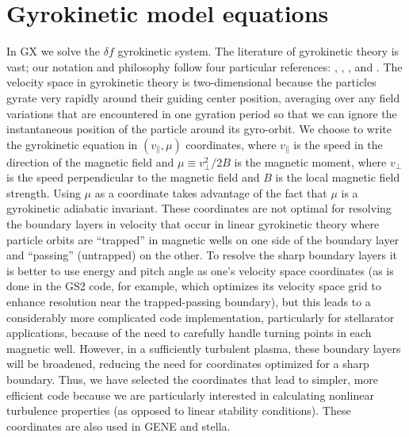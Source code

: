 \documentclass{jpp}
\newcommand{\GX}{{GX}\xspace}
\begin{document}
\section{Gyrokinetic model equations} \label{sec:gk}
In \GX we solve the $\delta\!f$ gyrokinetic system.
The literature of gyrokinetic theory is vast; our notation and philosophy follow four particular references: 
\cite{Antonsen1980},
 \cite{Frieman1982}, \cite{Barnes2010}, 
and \cite{Abel2013}. 
The velocity space in gyrokinetic theory is two-dimensional because the particles gyrate very rapidly around their guiding center position, averaging over any field variations that are encountered in one gyration period so that we can ignore the instantaneous position of the particle around its gyro-orbit.
We choose to write the gyrokinetic equation in $(v_\parallel,\mu)$ coordinates, where $v_\parallel$ is the speed in the direction of the magnetic field and $\mu \equiv v_\perp^2/2B$ is the magnetic moment, where $v_\perp$ is the speed perpendicular to the magnetic field {\color{black} and $B$ is the local magnetic field strength}. Using $\mu$ as a coordinate takes advantage of the fact that $\mu$ is a gyrokinetic adiabatic invariant.  These coordinates are not optimal for resolving the boundary layers in velocity that occur in linear gyrokinetic theory where particle orbits are ``trapped'' in magnetic wells on one side of the boundary layer and ``passing'' (untrapped) on the other. To resolve the sharp boundary layers it is better to use energy and pitch angle as one's velocity space coordinates (as is done in the GS2 code, for example, which optimizes its velocity space grid to enhance resolution near the trapped-passing boundary), but this leads to a considerably more complicated code {\color{black} implementation}, particularly for stellarator applications{\color{black}, because of the need to carefully handle turning points in each magnetic well}. However, in a sufficiently turbulent plasma, these boundary layers will be broadened{\color{black}, reducing the need for coordinates optimized for a sharp boundary}. Thus, we have selected the coordinates that lead to simpler, more efficient code because we are particularly interested in calculating nonlinear turbulence properties (as opposed to linear stability conditions). These coordinates are also used in GENE and stella.
\end{document}
